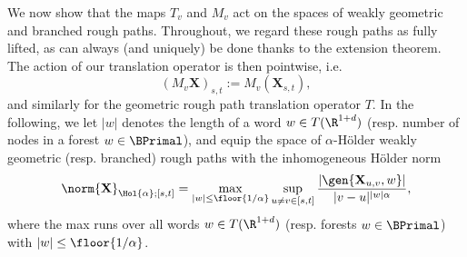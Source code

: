 \documentclass{article}
\begin{document}
We now show that the maps $T_v$ and $M_v$ act on the spaces of weakly geometric and branched rough paths. Throughout, we regard these rough paths as fully lifted, as can always (and uniquely) be done thanks to the extension theorem. The action of our translation operator is then pointwise, i.e.
$$
                                  (M_v\mathbf{X})_{s,t} := M_v (\mathbf{X}_{s,t}),
$$
and similarly for the geometric rough path translation operator $T$.  In the following, we let $|w|$ denotes the length of a word $w \in T(\R^{1+d})$ (resp. number of nodes in a forest $w \in \BPrimal$), and equip the space of $\alpha$-H{\"o}lder weakly geometric (resp. branched) rough paths with the inhomogeneous H{\"o}lder norm
\[
\norm{\mathbf{X}}_{\Hol{\alpha};[s,t]} =  \max_{|w| \leq \floor{1/\alpha}} \sup_{u \neq v \in [s,t]}\frac{|\gen{\mathbf{X}_{u,v},w}|}{|v-u|^{|w|\alpha}},
\]
where the max runs over all words $w \in T(\R^{1+d})$ (resp. forests $w \in \BPrimal$) with $|w| \leq \floor{1/\alpha}$.
\end{document}
